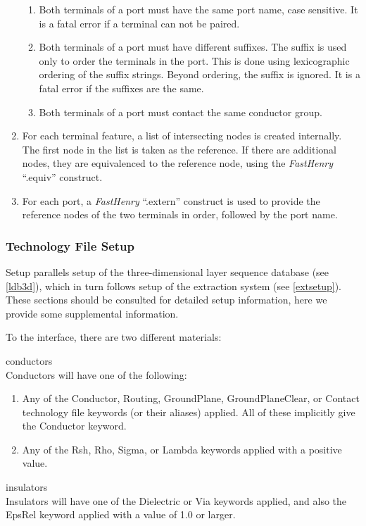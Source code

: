\begin{enumerate}
{\begin{enumerate}
\item{Both terminals of a port must have the same port name, case
sensitive.  It is a fatal error if a terminal can not be paired.}

\item{Both terminals of a port must have different suffixes.  The
suffix is used only to order the terminals in the port.  This is done
using lexicographic ordering of the suffix strings.  Beyond ordering,
the suffix is ignored.  It is a fatal error if the suffixes are the
same.}

\item{Both terminals of a port must contact the same conductor group.}
\end{enumerate} }

\item{For each terminal feature, a list of intersecting nodes is
created internally.  The first node in the list is taken as the
reference.  If there are additional nodes, they are equivalenced to
the reference node, using the {\it FastHenry} ``{\vt .equiv}''
construct.}

\item{For each port, a {\it FastHenry} ``{\vt .extern}'' construct is
used to provide the reference nodes of the two terminals in order,
followed by the port name.}
\end{enumerate}

\subsubsection{Technology File Setup}

Setup parallels setup of the three-dimensional layer sequence database
(see \ref{ldb3d}), which in turn follows setup of the extraction
system (see \ref{extsetup}).  These sections should be consulted for
detailed setup information, here we provide some supplemental
information.

To the interface, there are two different materials:
\begin{description}
\item{conductors}\\
Conductors will have one of the following:
\begin{enumerate}
\item{Any of the {\vt Conductor}, {\vt Routing}, {\vt GroundPlane},
{\vt GroundPlaneClear}, or {\vt Contact} technology file keywords (or
their aliases) applied.  All of these implicitly give the {\et
Conductor} keyword.}

\item{Any of the {\et Rsh}, {\et Rho}, {\et Sigma}, or {\et Lambda}
keywords applied with a positive value.}
\end{enumerate}

\item{insulators}\\
Insulators will have one of the {\et Dielectric} or {\et Via} keywords
applied, and also the {\et EpsRel} keyword applied with a value of 1.0
or larger.
\end{description}


